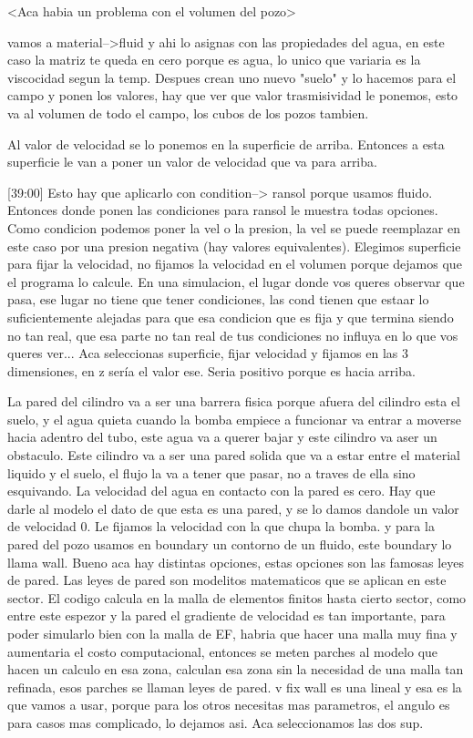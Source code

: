 \documentclass[10pt,a4paper,final]{article}
\begin{document}
<Aca habia un problema con el volumen del pozo>

vamos a material-->fluid y ahi lo asignas con las propiedades del agua, en este caso la matriz te queda en cero porque es agua, lo unico que variaria es la viscocidad segun la temp. Despues crean uno nuevo "suelo" y lo hacemos para el campo y ponen los valores, hay que ver que valor trasmisividad le ponemos, esto va al volumen de todo el campo, los cubos de los pozos tambien.

Al valor de velocidad se lo ponemos en la superficie de arriba. Entonces a esta superficie le van a poner un valor de velocidad que va para arriba.

[39:00]
Esto hay que aplicarlo con condition--> ransol porque usamos fluido. Entonces donde ponen las condiciones para ransol le muestra todas opciones. Como condicion podemos poner la vel o la presion, la vel se puede reemplazar en este caso por una presion negativa (hay valores equivalentes). Elegimos superficie para fijar la velocidad, no fijamos la velocidad en el volumen porque dejamos que el programa lo calcule. En una simulacion, el lugar donde vos queres observar que pasa, ese lugar no tiene que tener condiciones, las cond tienen que estaar lo suficientemente alejadas para que esa condicion que es fija y que termina siendo no tan real, que esa parte no tan real de tus condiciones no influya en lo que vos queres ver... Aca seleccionas superficie, fijar velocidad y fijamos en las 3 dimensiones, en z sería el valor ese. Seria positivo porque es hacia arriba.

La pared del cilindro va a ser una barrera fisica porque afuera del cilindro esta el suelo, y el agua quieta cuando la bomba empiece a funcionar va entrar a moverse hacia adentro del tubo, este agua va a querer bajar y este cilindro va aser un obstaculo. Este cilindro va a ser una pared solida que va a estar entre el material liquido y el suelo, el flujo la va a tener que pasar, no a traves de ella sino esquivando. La velocidad del agua en contacto con la pared es cero. Hay que darle al modelo el dato de que esta es una pared, y se lo damos dandole un valor de velocidad 0. Le fijamos la velocidad con la que chupa la bomba. y para la pared del pozo usamos en boundary un contorno de un fluido, este boundary lo llama wall. Bueno aca hay distintas opciones, estas opciones son las famosas leyes de pared. Las leyes de pared son modelitos matematicos que se aplican en este sector. El codigo calcula en la malla de elementos finitos hasta cierto sector, como entre este espezor y la pared el gradiente de velocidad es tan importante, para poder simularlo bien con la malla de EF, habria que hacer una malla muy fina y aumentaria el costo computacional, entonces se meten parches al modelo que hacen un calculo en esa zona, calculan esa zona sin la necesidad de una malla tan refinada, esos parches se llaman leyes de pared. v fix wall es una lineal y esa es la que vamos a usar, porque para los otros necesitas mas parametros, el angulo es para casos mas complicado, lo dejamos asi. Aca seleccionamos las dos sup. 
\end{document}
